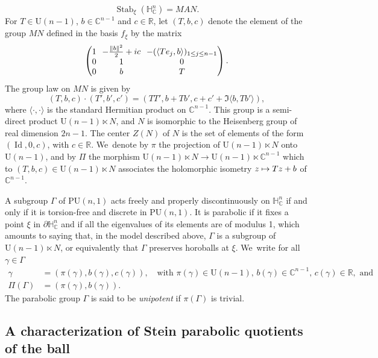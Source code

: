 \documentclass[JEP,XML,SOM,Unicode,NoEqCountersInSection,published]{cedram}
\newcommand\mto{\mathchoice{\longmapsto}{\mapsto}{\mapsto}{\mapsto}}
\theoremstyle{definition}
\newcommand{\C}{\mathbb{C}}
\newcommand{\R}{\mathbb{R}}
\newcommand{\HNC}{\mathbb{H}^{n}_{\C}}
\newcommand{\PHNC}{\partial\mathbb{H}^{n}_{\C}}
\newcommand{\PU}{\mathrm{PU}}
\DeclareMathOperator{\Id}{Id}
\def\C{\mathbb{C}}
\newcommand{\HNC}{\mathbb{H}^{n}_{\C}}
\newcommand{\PU}{\mathrm{PU}}
\begin{document}
\begin{equation*}
\operatorname{Stab}_{\xi}(\HNC)= MAN.
\end{equation*}
For $T\in \mathrm{U}(n-1)$, $b\in \C^{n-1}$ and $c\in \R$, let $(T,b,c)$ denote the element of the group $MN$ defined in the basis $f_{\xi}$ by the matrix
\begin{equation*}
\arraycolsep3.5pt\begin{pmatrix}
1 & -\frac{\lVert b\rVert^{2}}{2}+ic & -(\langle Te_j,b\rangle)_{1\le j\le n-1} \\
0 & 1 & 0 \\
0 & b & T
\end{pmatrix}.
\end{equation*}
The group law on $MN$ is given by
\begin{equation*}
(T,b,c)\cdot(T',b',c') = (TT',b+Tb',c+c'+\Im\langle b,Tb' \rangle),
\end{equation*}
where $\langle\cdot,\cdot\rangle$ is the standard Hermitian product on $\C^{n-1}$. This group is a semi-direct product $\mathrm{U}(n-1)\ltimes N$, and $N$ is isomorphic to the Heisenberg group of real dimension $2n-1$. The center $Z(N)$ of $N$ is the set of elements of the form $(\Id,0,c)$, with $c\in \R$. We~denote by $\pi$ the projection of $\mathrm{U}(n-1)\ltimes N$ onto $\mathrm{U}(n-1)$, and by $\Pi$ the morphism $\mathrm{U}(n-1)\ltimes N \to \mathrm{U}(n-1)\ltimes \C^{n-1}$ which to $(T,b,c)\in \mathrm{U}(n-1)\ltimes N$ associates the holomorphic isometry $z\mto Tz+b$ of $\C^{n-1}$.

A subgroup $\Gamma$ of $\PU(n,1)$ acts freely and properly discontinuously on $\HNC$ if and only if it is torsion-free and discrete in $\PU(n,1)$. It is parabolic if it fixes a point $\xi$ in $\PHNC$ and if all the eigenvalues of its elements are of modulus 1, which amounts to saying that, in the model described above, $\Gamma$ is a subgroup of $\mathrm{U}(n-1)\ltimes N$, or equivalently that $\Gamma$ preserves horoballs at $\xi$. We~write for all $\gamma\in \Gamma$
\begin{align*}
\gamma &= (\pi(\gamma),b(\gamma),c(\gamma)),\quad \text{with } \pi(\gamma)\in \mathrm{U}(n-1),\,b(\gamma)\in \C^{n-1},\,c(\gamma)\in \R, \text{ and }\\
\Pi(\Gamma) &= (\pi(\gamma),b(\gamma)).
\end{align*}
The parabolic group $\Gamma$ is said to be \textit{unipotent} if $\pi(\Gamma)$ is trivial.

\subsection{A characterization of Stein parabolic quotients of the ball}
\end{document}
